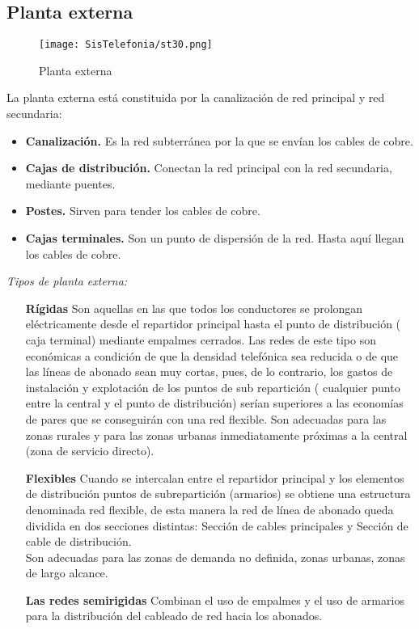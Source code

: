 \documentclass[11pt,fleqn]{book} %
\begin{document}
\subsection{Planta externa}
\begin{figure}[ht]
\centering\texttt{[image: SisTelefonia/st30.png]}
\caption{Planta externa}
\label{fig:Planta externa}
\end{figure}
La planta externa está constituida por la canalización de red principal y red secundaria: 
\begin{itemize}
\item \textbf{Canalización.} Es la red subterránea por la que se envían los cables de cobre.

\item \textbf{Cajas de distribución.} Conectan la red principal con la red secundaria, mediante puentes.

\item \textbf{Postes.} Sirven para tender los cables de cobre.

\item \textbf{Cajas terminales.} Son un punto de dispersión de la red. Hasta aquí llegan los cables de cobre. 
\end{itemize}
\textit{Tipos de planta externa:}
\begin{itemize}
\item[\textbf{Rígidas}] Son aquellas en las que todos los conductores se prolongan eléctricamente desde el repartidor principal hasta el punto de distribución ( caja terminal) mediante empalmes cerrados. Las redes de este tipo son económicas a condición de que la densidad telefónica sea reducida o de que las líneas de abonado sean muy cortas, pues, de lo contrario, los gastos de instalación y explotación de los puntos de sub repartición ( cualquier punto entre la central y el punto de distribución) serían superiores a las economías de pares que se conseguirán con una red flexible. Son adecuadas para las zonas rurales y para las zonas urbanas inmediatamente próximas a la central (zona de servicio directo). 
\item[\textbf{Flexibles}] Cuando se intercalan entre el repartidor principal y los elementos de distribución puntos de subrepartición (armarios) se obtiene una estructura denominada red flexible, de esta  manera la red de línea de abonado queda dividida en dos secciones distintas: Sección de cables principales y Sección de cable de distribución.\\
Son adecuadas para las zonas de demanda no definida, zonas urbanas, zonas de largo alcance.
\item[\textbf{Las redes semirigidas}] Combinan el uso de empalmes y el uso de armarios para la distribución del cableado de red hacia los abonados.
\end{itemize}
\end{document}
